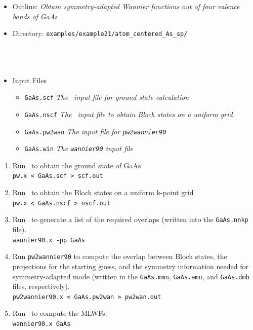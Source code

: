 \documentclass[a4paper,11pt,twoside]{article}
\begin{document}
\begin{itemize}
\item{Outline: \it{Obtain symmetry-adapted Wannier functions out of four valence bands of GaAs}}
\item{Directory: {\tt examples/example21/atom\_centered\_As\_sp/} \\
\phantom{Directory: }{\tt examples/example21/atom\_centered\_Ga\_p/}    \\
\phantom{Directory: }{\tt examples/example21/atom\_centered\_Ga\_s/}    \\
\phantom{Directory: }{\tt examples/example21/atom\_centered\_Ga\_sp/}    \\
\phantom{Directory: }{\tt examples/example21/bond\_centered/}    
}
\item{Input Files}
\begin{itemize}
\item{ {\tt GaAs.scf}  {\it The \pwscf\ input file for ground state
    calculation}} 
\item{ {\tt GaAs.nscf}  {\it The \pwscf\ input file to obtain Bloch
    states on a uniform grid}} 
\item{ {\tt GaAs.pw2wan}  {\it The input file for {\tt pw2wannier90}}}
\item{ {\tt GaAs.win}  {\it The {\tt wannier90} input file}}
\end{itemize}
\end{itemize}

\begin{enumerate}
\item Run \pwscf\ to obtain the ground state of GaAs\\
{\tt pw.x < GaAs.scf > scf.out}

\item Run \pwscf\ to obtain the Bloch states on a uniform k-point grid\\
{\tt pw.x < GaAs.nscf > nscf.out}

\item Run \wannier\ to generate a list of the required overlaps (written
  into the {\tt GaAs.nnkp} file).\\ 
{\tt wannier90.x -pp GaAs}

\item Run {\tt pw2wannier90} to compute the overlap between Bloch
  states, the projections for the starting guess, and the symmetry information needed for symmetry-adapted mode (written in the
  {\tt GaAs.mmn}, {\tt GaAs.amn}, and {\tt GaAs.dmb} files, respectively).\\  
{\tt pw2wannier90.x < GaAs.pw2wan > pw2wan.out}

\item Run \wannier\ to compute the MLWFs.\\
{\tt wannier90.x GaAs}
\end{enumerate}
\end{document}
